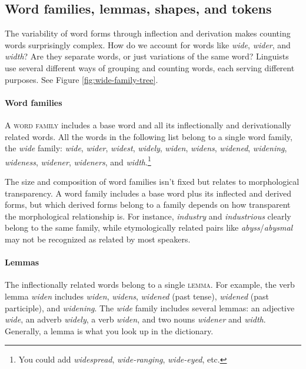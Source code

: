 \subsection{Word families, lemmas, shapes, and tokens}\label{sec:family-lemma-shape-token}

The variability of word forms through inflection and derivation makes counting words surprisingly complex. How do we account for words like \textit{wide}, \textit{wider}, and \textit{width}? Are they separate words, or just variations of the same word? Linguists use several different ways of grouping and counting words, each serving different purposes. See Figure \ref{fig:wide-family-tree}.

\paragraph*{Word families} A \textsc{word family} includes a base word and all its inflectionally and derivationally related words. All the words in the following list belong to a single word family, the \textit{wide} family: \textit{wide}, \textit{wider}, \textit{widest}, \textit{widely}, \textit{widen}, \textit{widens}, \textit{widened}, \textit{widening}, \textit{wideness}, \textit{widener}, \textit{wideners}, and \textit{width}.\footnote{You could add \textit{widespread}, \textit{wide-ranging}, \textit{wide-eyed}, etc.}

The size and composition of word families isn't fixed but relates to morphological transparency. A word family includes a base word plus its inflected and derived forms, but which derived forms belong to a family depends on how transparent the morphological relationship is. For instance, \textit{industry} and \textit{industrious} clearly belong to the same family, while etymologically related pairs like \textit{abyss}/\textit{abysmal} may not be recognized as related by most speakers.

\paragraph*{Lemmas} The inflectionally related words belong to a single \textsc{lemma}. For example, the verb lemma \textit{widen} includes \textit{widen}, \textit{widens}, \textit{widened} (past tense), \textit{widened} (past participle), and \textit{widening}. The \textit{wide} family includes several lemmas: an adjective \textit{wide}, an adverb \textit{widely}, a verb \textit{widen}, and two nouns \textit{widener} and \textit{width}. Generally, a lemma is what you look up in the dictionary.

